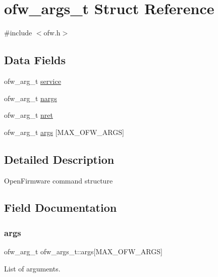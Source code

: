 \hypertarget{structofw__args__t}{}\section{ofw\+\_\+args\+\_\+t Struct Reference}
\label{structofw__args__t}


{\ttfamily \#include $<$ofw.\+h$>$}

\subsection*{Data Fields}
\begin{DoxyCompactItemize}
\item 
ofw\+\_\+arg\+\_\+t \mbox{\hyperlink{structofw__args__t_a347ca72e15bf76401bd580cc218dca59}{service}}
\item 
ofw\+\_\+arg\+\_\+t \mbox{\hyperlink{structofw__args__t_a82ad3d4a936b0332886d48aebd8f3c8a}{nargs}}
\item 
ofw\+\_\+arg\+\_\+t \mbox{\hyperlink{structofw__args__t_a4c83343f10ca0efb931557041280d146}{nret}}
\item 
ofw\+\_\+arg\+\_\+t \mbox{\hyperlink{structofw__args__t_a2b1d09c7896eac42618439a80ab940da}{args}} \mbox{[}M\+A\+X\+\_\+\+O\+F\+W\+\_\+\+A\+R\+GS\mbox{]}
\end{DoxyCompactItemize}


\subsection{Detailed Description}
Open\+Firmware command structure 

\subsection{Field Documentation}
\mbox{\label{structofw__args__t_a2b1d09c7896eac42618439a80ab940da}} 
\subsubsection{\texorpdfstring{args}{args}}
{\footnotesize\ttfamily ofw\+\_\+arg\+\_\+t ofw\+\_\+args\+\_\+t\+::args\mbox{[}M\+A\+X\+\_\+\+O\+F\+W\+\_\+\+A\+R\+GS\mbox{]}}

List of arguments. \mbox{\label{structofw__args__t_a82ad3d4a936b0332886d48aebd8f3c8a}} 
